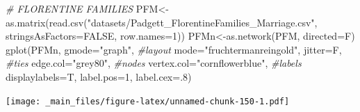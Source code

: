 \documentclass[
  notitlepage,
  onecolumn,
  openany]{book}
\newenvironment{Shaded}{\begin{snugshade}}{\end{snugshade}}
\newcommand{\AttributeTok}[1]{\textcolor[rgb]{0.77,0.63,0.00}{#1}}
\newcommand{\CommentTok}[1]{\textcolor[rgb]{0.56,0.35,0.01}{\textit{#1}}}
\newcommand{\ConstantTok}[1]{\textcolor[rgb]{0.00,0.00,0.00}{#1}}
\newcommand{\DecValTok}[1]{\textcolor[rgb]{0.00,0.00,0.81}{#1}}
\newcommand{\FunctionTok}[1]{\textcolor[rgb]{0.00,0.00,0.00}{#1}}
\newcommand{\NormalTok}[1]{#1}
\newcommand{\OtherTok}[1]{\textcolor[rgb]{0.56,0.35,0.01}{#1}}
\newcommand{\StringTok}[1]{\textcolor[rgb]{0.31,0.60,0.02}{#1}}
\begin{document}
\begin{Shaded}
\begin{Highlighting}[]
\CommentTok{\# FLORENTINE FAMILIES}
\NormalTok{PFM}\OtherTok{\textless{}{-}}\FunctionTok{as.matrix}\NormalTok{(}\FunctionTok{read.csv}\NormalTok{(}\StringTok{"datasets/Padgett\_FlorentineFamilies\_Marriage.csv"}\NormalTok{,}
                        \AttributeTok{stringsAsFactors=}\ConstantTok{FALSE}\NormalTok{, }\AttributeTok{row.names=}\DecValTok{1}\NormalTok{))}
\NormalTok{PFMn}\OtherTok{\textless{}{-}}\FunctionTok{as.network}\NormalTok{(PFM, }\AttributeTok{directed=}\NormalTok{F)}
\FunctionTok{gplot}\NormalTok{(PFMn, }
      \AttributeTok{gmode=}\StringTok{"graph"}\NormalTok{,}
      \CommentTok{\#layout}
      \AttributeTok{mode=}\StringTok{"fruchtermanreingold"}\NormalTok{,}
      \AttributeTok{jitter=}\NormalTok{F,}
      \CommentTok{\#ties}
      \AttributeTok{edge.col=}\StringTok{"grey80"}\NormalTok{,}
      \CommentTok{\#nodes}
      \AttributeTok{vertex.col=}\StringTok{"cornflowerblue"}\NormalTok{,}
      \CommentTok{\#labels}
      \AttributeTok{displaylabels=}\NormalTok{T,}
      \AttributeTok{label.pos=}\DecValTok{1}\NormalTok{,}
      \AttributeTok{label.cex=}\NormalTok{.}\DecValTok{8}\NormalTok{)}
\end{Highlighting}
\end{Shaded}

\texttt{[image: \_main\_files/figure-latex/unnamed-chunk-150-1.pdf]}
\end{document}
